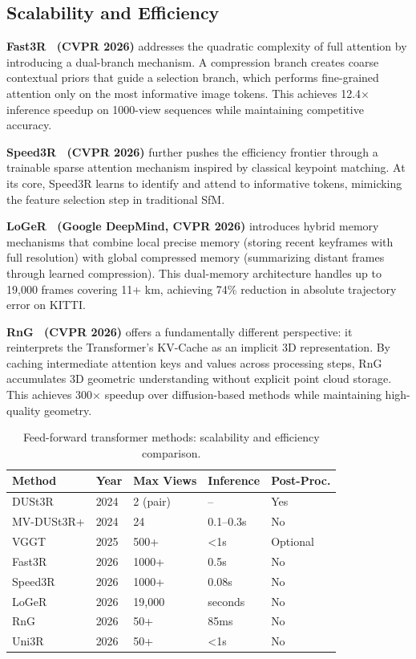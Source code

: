 \documentclass[journal]{IEEEtran}
\begin{document}
\subsection{Scalability and Efficiency}

\textbf{Fast3R~\cite{fast3r} (CVPR 2026)} addresses the quadratic complexity of full attention by introducing a dual-branch mechanism. A compression branch creates coarse contextual priors that guide a selection branch, which performs fine-grained attention only on the most informative image tokens. This achieves 12.4$\times$ inference speedup on 1000-view sequences while maintaining competitive accuracy.

\textbf{Speed3R~\cite{speed3r} (CVPR 2026)} further pushes the efficiency frontier through a trainable sparse attention mechanism inspired by classical keypoint matching. At its core, Speed3R learns to identify and attend to informative tokens, mimicking the feature selection step in traditional SfM.

\textbf{LoGeR~\cite{loger} (Google DeepMind, CVPR 2026)} introduces hybrid memory mechanisms that combine local precise memory (storing recent keyframes with full resolution) with global compressed memory (summarizing distant frames through learned compression). This dual-memory architecture handles up to 19,000 frames covering 11+ km, achieving 74\% reduction in absolute trajectory error on KITTI.

\textbf{RnG~\cite{rng} (CVPR 2026)} offers a fundamentally different perspective: it reinterprets the Transformer's KV-Cache as an implicit 3D representation. By caching intermediate attention keys and values across processing steps, RnG accumulates 3D geometric understanding without explicit point cloud storage. This achieves 300$\times$ speedup over diffusion-based methods while maintaining high-quality geometry.

\begin{table}[t]
\caption{Feed-forward transformer methods: scalability and efficiency comparison.}
\label{tab:transformer_compare}
\centering
\small
\begin{tabular}{p{1.8cm}p{1.2cm}p{1.2cm}p{1.5cm}p{1.5cm}}
\toprule
Method & Year & Max Views & Inference & Post-Proc. \\
\midrule
DUSt3R & 2024 & 2 (pair) & -- & Yes \\
MV-DUSt3R+ & 2024 & 24 & 0.1--0.3s & No \\
VGGT & 2025 & 500+ & <1s & Optional \\
Fast3R & 2026 & 1000+ & 0.5s & No \\
Speed3R & 2026 & 1000+ & 0.08s & No \\
LoGeR & 2026 & 19,000 & seconds & No \\
RnG & 2026 & 50+ & 85ms & No \\
Uni3R & 2026 & 50+ & <1s & No \\
\bottomrule
\end{tabular}
\end{table}
\end{document}
